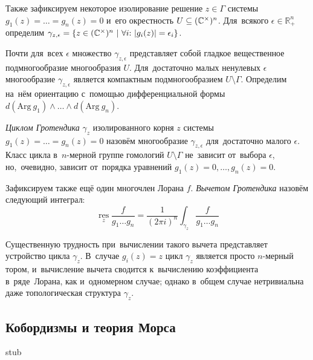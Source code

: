 \documentclass{article}
\begin{document}
Также зафиксируем некоторое изолирование решение $z \in \Gamma$ системы $g_1(z) = \ldots = g_n(z) = 0$ и~его окрестность $U \subseteq (\mathbb{C}^\times)^n$.
Для~всякого $\epsilon \in \mathbb{R}_{+}^n$ определим $\gamma_{z, \epsilon} = \{ z \in (\mathbb{C}^\times)^n\ | \ \forall i{:}\ |g_i(z)| = \epsilon_i \}$.

Почти для~всех $\epsilon$ множество $\gamma_{z, \epsilon}$ представляет собой гладкое вещественное подмногообразие многообразия $U$.
Для~достаточно малых ненулевых $\epsilon$ многообразие $\gamma_{z, \epsilon}$ является компактным подмногообразием $U \setminus \Gamma$.
Определим на~нём ориентацию с~помощью дифференциальной формы $d(\mathrm{Arg}\ g_1) \wedge \ldots \wedge d(\mathrm{Arg}\ g_n)$.

\textit{Циклом Гротендика} $\gamma_z$ \cite{GelKho02} изолированного корня $z$ системы $g_1(z) = \ldots = g_n(z) = 0$ назовём многообразие $\gamma_{z, \epsilon}$ для~достаточно малого $\epsilon$.
Класс цикла в~$n$-мерной группе гомологий $U \setminus \Gamma$ не~зависит от~выбора $\epsilon$, но,~очевидно, зависит от~порядка уравнений $g_1(z) = 0, \ldots, g_n(z) = 0$.

Зафиксируем также ещё один многочлен Лорана $f$. \textit{Вычетом Гротендика} назовём следующий интеграл:
$$
  \operatorname*{res}\limits_{z} \frac{f}{g_1 \ldots g_n} = \frac{1}{(2 \pi i)^n} \int_{\gamma_z} \frac{f}{g_1 \ldots g_n}
$$

Существенную трудность при~вычислении такого вычета представляет устройство цикла $\gamma_z$.
В~случае $g_i(z) = z$ цикл $\gamma_z$ является просто $n$-мерный тором, и~вычисление вычета
сводится к~вычислению коэффициента в~ряде~Лорана, как и~одномерном случае; однако в~общем случае
нетривиальна даже топологическая структура $\gamma_z$.

\subsection{Кобордизмы и теория Морса}

stub

\pagebreak

\end{document}
